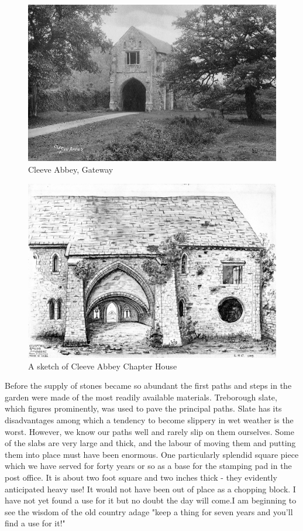 \begin{figure}
	\centering
     \includegraphics[width=1\textwidth]{figures/CleeveAbbey}
     \caption{Cleeve Abbey, Gateway}
     \label{fig:CleeveAbbey}
\end{figure}

\begin{figure}
	\centering
     \includegraphics[width=1\textwidth]{figures/ChapterHouse}
     \caption{A sketch of Cleeve Abbey Chapter House}
     \label{fig:ChapterHouse}
\end{figure}

Before the supply of stones became so abundant the first paths and steps in the garden were made of the most readily available materials. Treborough slate, which figures prominently, was used to pave the principal paths. Slate has its disadvantages among which a tendency to become slippery in wet weather is the worst. However, we know our paths well and rarely slip on them ourselves. Some of the slabs are very large and thick, and the labour of moving them and putting them into place must have been enormous. One particularly splendid square piece which we have served for forty years or so as a base for the stamping pad in the post office. It is about two foot square and two inches thick - they evidently anticipated heavy use! It would not have been out of place as a chopping block. I have not yet found a use for it but no doubt the day will come.I am beginning to see the wisdom of the old country adage "keep a thing for seven years and you'll find a use for it!"

